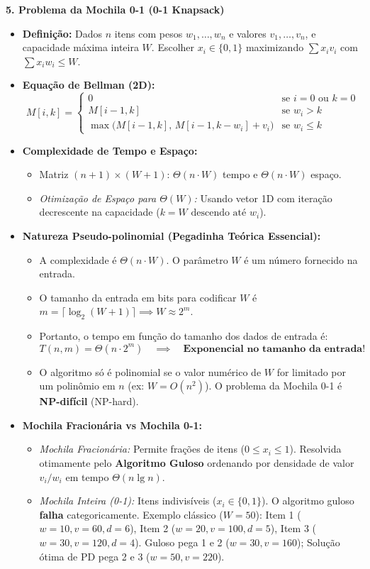 \documentclass[11pt,a4paper]{article}
\newcommand{\topico}[1]{\par\medskip\textbf{\color{azul}#1}\par}
\begin{document}
\topico{5. Problema da Mochila 0-1 (0-1 Knapsack)}
\begin{itemize}
  \item \textbf{Definição:} Dados $n$ itens com pesos $w_1, \dots, w_n$ e valores $v_1, \dots, v_n$, e capacidade máxima inteira $W$. Escolher $x_i \in \{0, 1\}$ maximizando $\sum x_i v_i$ com $\sum x_i w_i \le W$.
  \item \textbf{Equação de Bellman (2D):}
  \[
  \boxed{M[i, k] = \begin{cases}
  0 & \text{se } i = 0 \text{ ou } k = 0 \\
  M[i-1, k] & \text{se } w_i > k \\
  \max\big(M[i-1, k], \, M[i-1, k - w_i] + v_i\big) & \text{se } w_i \le k
  \end{cases}}
  \]
  \item \textbf{Complexidade de Tempo e Espaço:}
  \begin{itemize}
    \item Matriz $(n+1) \times (W+1)$: $\Theta(n \cdot W)$ tempo e $\Theta(n \cdot W)$ espaço.
    \item \textit{Otimização de Espaço para $\Theta(W)$:} Usando vetor 1D com iteração decrescente na capacidade ($k = W \text{ descendo até } w_i$).
  \end{itemize}
  \item \textbf{Natureza Pseudo-polinomial (Pegadinha Teórica Essencial):}
  \begin{itemize}
    \item A complexidade é $\Theta(n \cdot W)$. O parâmetro $W$ é um número fornecido na entrada.
    \item O tamanho da entrada em bits para codificar $W$ é $m = \lceil \log_2(W+1) \rceil \implies W \approx 2^m$.
    \item Portanto, o tempo em função do tamanho dos dados de entrada é:
    \[
    T(n, m) = \Theta(n \cdot 2^m) \quad \implies \quad \textbf{Exponencial no tamanho da entrada!}
    \]
    \item O algoritmo só é polinomial se o valor numérico de $W$ for limitado por um polinômio em $n$ (ex: $W = O(n^2)$). O problema da Mochila 0-1 é \textbf{NP-difícil} (NP-hard).
  \end{itemize}
  \item \textbf{Mochila Fracionária vs Mochila 0-1:}
  \begin{itemize}
    \item \textit{Mochila Fracionária:} Permite frações de itens ($0 \le x_i \le 1$). Resolvida otimamente pelo \textbf{Algoritmo Guloso} ordenando por densidade de valor $v_i/w_i$ em tempo $\Theta(n \lg n)$.
    \item \textit{Mochila Inteira (0-1):} Itens indivisíveis ($x_i \in \{0, 1\}$). O algoritmo guloso \textbf{falha} categoricamente. Exemplo clássico ($W=50$): Item 1 ($w=10, v=60, d=6$), Item 2 ($w=20, v=100, d=5$), Item 3 ($w=30, v=120, d=4$). Guloso pega 1 e 2 ($w=30, v=160$); Solução ótima de PD pega 2 e 3 ($w=50, v=220$).
  \end{itemize}
\end{itemize}
\end{document}
